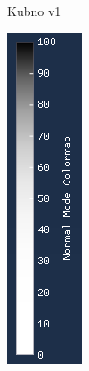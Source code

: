 \documentclass[times, utf8, diplomski]{fer}
\begin{document}
\begin{figure} [H]
\begin{subfigure}[h]{0.16\textwidth}
         \caption{Kubno v1}
         \label{fig:cubic_legend}
     \end{subfigure}
     \hfill
     \begin{subfigure}[h]{0.16\textwidth}
         \centering
         \includegraphics[width=\textwidth]{quartic_colormap.png}

\end{subfigure}
\end{figure}
\end{document}
